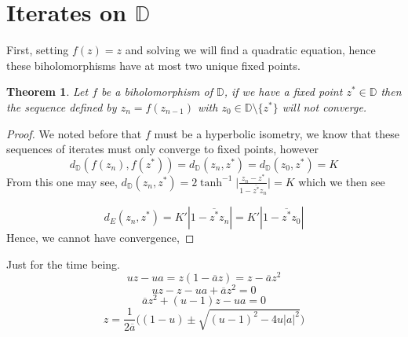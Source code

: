 \documentclass{article}
\newcommand{\D}{\mathbb{D}}
\newtheorem{theorem}{Theorem}
\begin{document}
\section{Iterates on $\D$}
First, setting $f(z) = z$ and solving we will find a quadratic equation, hence these biholomorphisms have at most two unique fixed points.
\begin{theorem}
    Let $f$ be a biholomorphism of $\D$, if we have a fixed point $z^*\in\D$ then the sequence defined by $z_n = f(z_{n-1})$ with $z_0\in\D\setminus\{z^*\}$ will not converge.
\end{theorem}
\begin{proof}
    We noted before that $f$ must be a hyperbolic isometry, we know that these sequences of iterates must only converge to fixed points, however
    \begin{equation*}
        d_\D(f(z_n), f(z^*)) = d_\D(z_n, z^*) = d_\D(z_0, z^*) = K
    \end{equation*}
    From this one may see, $d_\D(z_n, z^*) = 2 \tanh^{-1}\bigg|\frac{z_n - z^*}{1-\overline{z^*}z_n} \bigg|  = K$ which we then see 

    \begin{equation*}
        d_E(z_n, z^*) = K'|1-\overline{z^*}z_n| = K'|1-\overline{z^*}z_0| 
    \end{equation*}
    Hence, we cannot have convergence,
\end{proof}
Just for the time being.
\begin{equation*}
    uz- ua =  z(1-\overline{a}z) = z - \overline{a}z^2 
\end{equation*}
\begin{equation*}
    uz - z - ua + \overline{a}z^2 = 0
\end{equation*}
\begin{equation*}
    \overline{a}z^2 + (u-1)z - ua = 0
\end{equation*}
\begin{equation*}
    z = \frac{1}{2\overline{a}} \bigg( (1-u) \pm \sqrt{(u-1)^2 - 4u|a|^2}\bigg)
\end{equation*}
\end{document}
